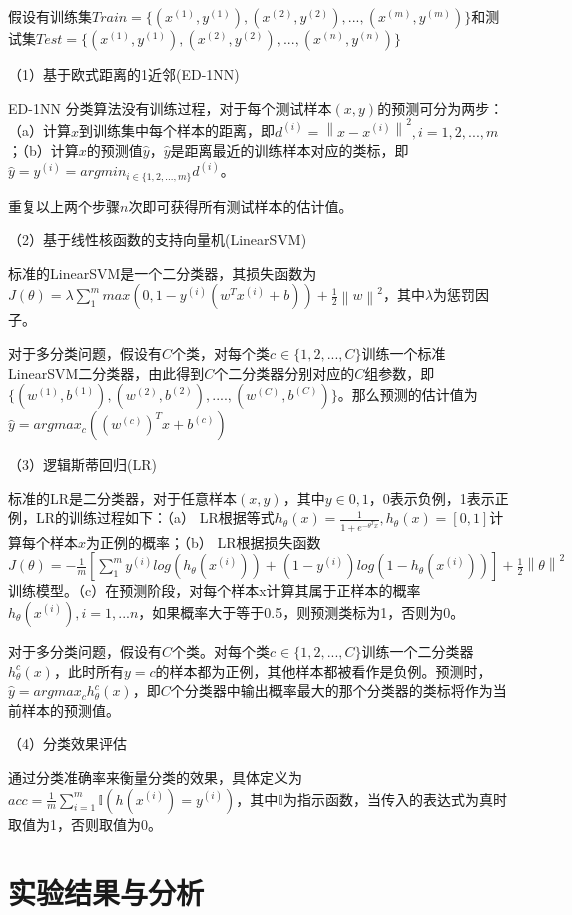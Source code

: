 假设有训练集$Train = \{(x^{(1)}, y^{(1)}), (x^{(2)}, y^{(2)}), ..., (x^{(m)}, y^{(m)})\}$和测试集$Test = \{(x^{(1)}, y^{(1)}), (x^{(2)}, y^{(2)}), ..., (x^{(n)}, y^{(n)})\}$

（1）基于欧式距离的1近邻(ED-1NN) 

ED-1NN 分类算法没有训练过程，对于每个测试样本$(x,y)$的预测可分为两步：（a）计算$x$到训练集中每个样本的距离，即$d^{(i)} = \left \| x-x^{(i)} \right \|^{2},i=1,2,...,m$；（b）计算$x$的预测值$\hat{y}$，$\hat{y}$是距离最近的训练样本对应的类标，即$\hat{y}=y^{(i)}=argmin_{i \in \{1,2,...,m\}}d^{(i)}$。

重复以上两个步骤$n$次即可获得所有测试样本的估计值。

（2）基于线性核函数的支持向量机(LinearSVM)

标准的LinearSVM是一个二分类器，其损失函数为$J(\theta) = \lambda\sum_{1}^{m}max(0, 1-y^{(i)}(w^{T}x^{(i)}+b)) +  \frac{1}{2}\left \| w \right \|^{2}$，其中$\lambda$为惩罚因子。

对于多分类问题，假设有$C$个类，对每个类$c \in \{1,2,...,C\}$训练一个标准LinearSVM二分类器，由此得到$C$个二分类器分别对应的$C$组参数，即$\{(w^{(1)}, b^{(1)}), (w^{(2)}, b^{(2)}), ...., (w^{(C)}, b^{(C)})\}$。那么预测的估计值为$\hat{y} = argmax_{c}((w^{(c)})^{T}x+b^{(c)})$

（3）逻辑斯蒂回归(LR)

标准的LR是二分类器，对于任意样本$(x,y)$，其中$y \in {0,1}$，0表示负例，1表示正例，LR的训练过程如下：（a） LR根据等式$h_{\theta}(x) = \frac{1}{1+e^{-\theta^{T}x}}, h_{\theta}(x) = [0,1]$计算每个样本$x$为正例的概率；（b） LR根据损失函数$J(\theta) = -\frac{1}{m}[\sum_{1}^{m}y^{(i)}log(h_{\theta}(x^{(i)}))+(1-y^{(i)})log(1-h_{\theta}(x^{(i)}))] + \frac{1}{2}\left \| \theta \right \|^{2}$ 训练模型。（c）在预测阶段，对每个样本x计算其属于正样本的概率$h_{\theta}(x^{(i)}), i=1,...n$，如果概率大于等于0.5，则预测类标为1，否则为0。

对于多分类问题，假设有$C$个类。对每个类$c \in \{1,2,...,C\}$训练一个二分类器$ h_{\theta}^{c}(x)$，此时所有$y=c$的样本都为正例，其他样本都被看作是负例。预测时，$ \hat{y} = argmax_{c} h_{\theta}^{c}(x)$，即$C$个分类器中输出概率最大的那个分类器的类标将作为当前样本的预测值。

（4）分类效果评估

通过分类准确率来衡量分类的效果，具体定义为$acc = \frac{1}{m}\sum_{i=1}^{m}\mathbb{I}(h(x^{(i)}) = y^{(i)})$，其中$\mathbb{I}$为指示函数，当传入的表达式为真时取值为1，否则取值为0。


\section{实验结果与分析}

